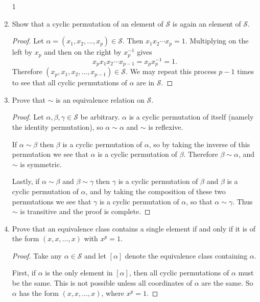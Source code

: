 \begin{enumerate}
  \setcounter{enumi}1
\item Show that a cyclic permutation of an element of $\mathcal{S}$ is
  again an element of $\mathcal{S}$.
  \begin{proof}
    Let $\alpha = (x_1,x_2,\dots,x_p)\in\mathcal{S}$. Then
    $x_1x_2\cdots x_p = 1$. Multiplying on the left by $x_p$ and then
    on the right by $x_p^{-1}$ gives
    \begin{equation*}
      x_px_1x_2\cdots x_{p-1} = x_px_p^{-1} = 1.
    \end{equation*}
    Therefore $(x_p,x_1,x_2,\dots,x_{p-1})\in\mathcal{S}$. We may
    repeat this process $p-1$ times to see that all cyclic
    permutations of $\alpha$ are in $\mathcal{S}$.
  \end{proof}
\item Prove that $\sim$ is an equivalence relation on $\mathcal{S}$.
  \begin{proof}
    Let $\alpha,\beta,\gamma\in\mathcal{S}$ be arbitrary. $\alpha$ is
    a cyclic permutation of itself (namely the identity permutation),
    so $\alpha\sim\alpha$ and $\sim$ is reflexive.

    If $\alpha\sim\beta$ then $\beta$ is a cyclic permutation of
    $\alpha$, so by taking the inverse of this permutation we see that
    $\alpha$ is a cyclic permutation of $\beta$. Therefore
    $\beta\sim\alpha$, and $\sim$ is symmetric.

    Lastly, if $\alpha\sim\beta$ and $\beta\sim\gamma$ then $\gamma$
    is a cyclic permutation of $\beta$ and $\beta$ is a cyclic
    permutation of $\alpha$, and by taking the composition of these
    two permutations we see that $\gamma$ is a cyclic permutation of
    $\alpha$, so that $\alpha\sim\gamma$. Thus $\sim$ is transitive
    and the proof is complete.
  \end{proof}
\item Prove that an equivalence class contains a single element if and
  only if it is of the form $(x,x,\dots,x)$ with $x^p = 1$.
  \begin{proof}
    Take any $\alpha\in\mathcal{S}$ and let $[\alpha]$ denote the
    equivalence class containing $\alpha$.

    First, if $\alpha$ is the only element in $[\alpha]$, then all
    cyclic permutations of $\alpha$ must be the same. This is not
    possible unless all coordinates of $\alpha$ are the same. So
    $\alpha$ has the form $(x,x,\dots,x)$, where $x^p = 1$.


\end{proof}
\end{enumerate}
